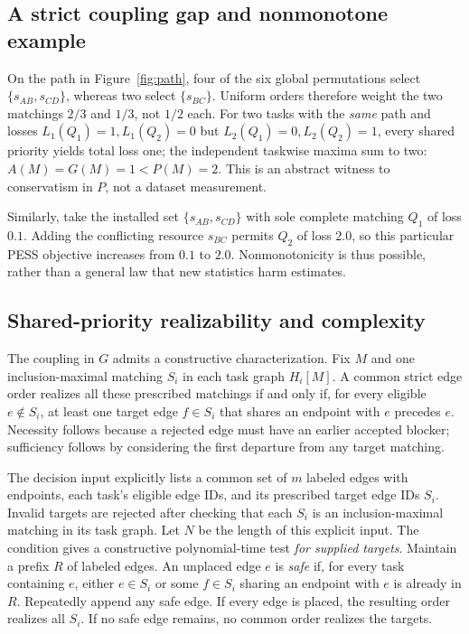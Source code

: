 \documentclass[sigconf, nonacm]{acmart}
\begin{document}
\subsection{A strict coupling gap and nonmonotone example}
On the path in Figure~\ref{fig:path}, four of the six global
permutations select \(\{s_{AB},s_{CD}\}\), whereas two select
\(\{s_{BC}\}\). Uniform orders therefore weight the two
matchings \(2/3\) and \(1/3\), not \(1/2\) each.
For two tasks with the \emph{same} path and losses
\(L_1(Q_1)=1,L_1(Q_2)=0\) but
\(L_2(Q_1)=0,L_2(Q_2)=1\), every shared priority yields
total loss one; the independent taskwise maxima sum to two:
\(A(M)=G(M)=1<P(M)=2\). This is an abstract witness to
conservatism in \(P\), not a dataset measurement.

Similarly, take the installed set \(\{s_{AB},s_{CD}\}\)
with sole complete matching \(Q_1\) of loss \(0.1\).
Adding the conflicting resource \(s_{BC}\) permits \(Q_2\)
of loss \(2.0\), so this particular PESS objective increases
from \(0.1\) to \(2.0\). Nonmonotonicity is thus possible,
rather than a general law that new statistics harm estimates.

\subsection{Shared-priority realizability and complexity}
\label{sec:shared-theory}
The coupling in \(G\) admits a constructive characterization.
Fix \(M\) and one inclusion-maximal matching \(S_i\) in each
task graph \(H_i[M]\). A common strict edge order realizes
all these prescribed matchings if and only if, for every
eligible \(e\notin S_i\), at least one target edge
\(f\in S_i\) that shares an endpoint with \(e\) precedes
\(e\). Necessity follows because a rejected edge must
have an earlier accepted blocker; sufficiency follows
by considering the first departure from any target matching.

The decision input explicitly lists a common set of $m$
labeled edges with endpoints, each task's eligible
edge IDs, and its prescribed target edge IDs $S_i$.
Invalid targets are rejected after checking that each
$S_i$ is an inclusion-maximal matching in its task
graph. Let $N$ be the length of this explicit input.
The condition gives a constructive polynomial-time test
\emph{for supplied targets}. Maintain a prefix $R$ of
labeled edges. An unplaced edge $e$ is \emph{safe} if,
for every task containing $e$, either $e\in S_i$ or
some $f\in S_i$ sharing an endpoint with $e$ is
already in $R$. Repeatedly append any safe edge.
If every edge is placed, the resulting order realizes
all $S_i$. If no safe edge remains, no common order
realizes the targets.
\end{document}
